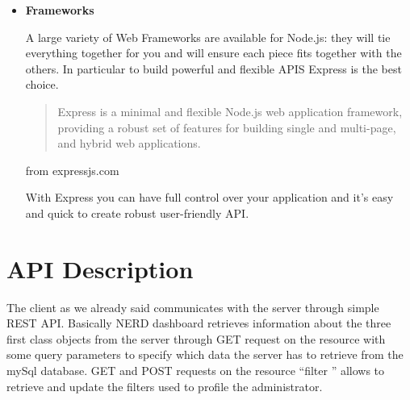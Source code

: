 \documentclass[a4paper,13pt]{report}
\begin{document}
\begin{itemize}
                        \item
            \textbf{Frameworks}

            A large variety of Web Frameworks are available for Node.js: they will tie everything together for you and will ensure each piece fits together with the others.
            In particular to build powerful and flexible APIS Express is the best choice.
            \begin{quote}
            Express is a minimal and flexible Node.js web application framework, providing a robust set of features for building single and multi-page, and hybrid web applications.
            \end{quote}
                    \begin{flushright}
          from expressjs.com  \cite{express}
        \end{flushright}


            With Express you can have full control over your application and it's easy and quick to create robust user-friendly API.

        \end{itemize}
    \section{API Description}
        The client as we already said communicates with the server through simple REST API.
        Basically NERD dashboard retrieves information about the three first class objects from the server through GET request on the resource with some query parameters to specify which data the server has to retrieve from the mySql database.
        GET and POST requests on the resource ``filter '' allows to retrieve and update the filters used to profile the administrator.

\end{document}
